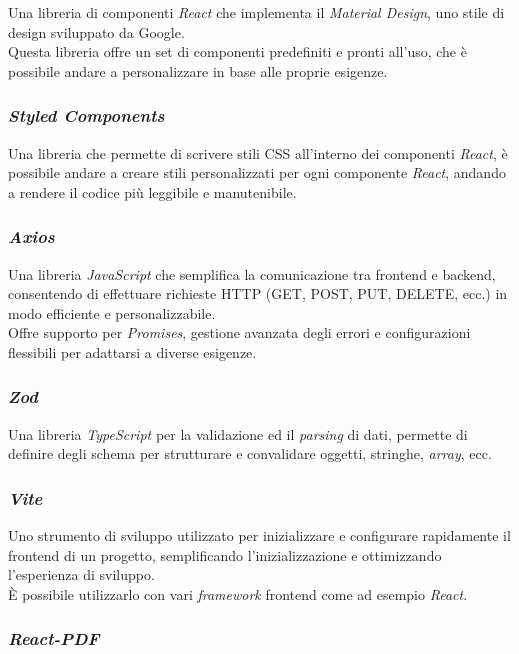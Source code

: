 Una libreria di componenti \textit{React} che implementa il \textit{Material Design}, uno stile di design sviluppato da Google.\\
Questa libreria offre un set di componenti predefiniti e pronti all’uso, che è possibile andare a personalizzare in base alle proprie esigenze.

\subsubsection{\textit{Styled Components}}

Una libreria che permette di scrivere stili CSS all’interno dei componenti \textit{React}, è possibile andare a creare stili personalizzati per ogni componente \textit{React}, andando a rendere il codice più leggibile e manutenibile.

\subsubsection{\textit{Axios}}

Una libreria \textit{JavaScript} che semplifica la comunicazione tra frontend e backend, consentendo di effettuare richieste HTTP (GET, POST, PUT, DELETE, ecc.) in modo efficiente e personalizzabile. \\
Offre supporto per \textit{Promises}, gestione avanzata degli errori e configurazioni flessibili per adattarsi a diverse esigenze.

\subsubsection{\textit{Zod}}

Una libreria \textit{TypeScript} per la validazione ed il \textit{parsing} di dati, permette di definire degli schema per strutturare e convalidare oggetti, stringhe, \textit{array}, ecc.

\subsubsection{\textit{Vite}}

Uno strumento di sviluppo utilizzato per inizializzare e configurare rapidamente il \gls{frontend} di un progetto, semplificando l'inizializzazione e ottimizzando l'esperienza di sviluppo.\\
È possibile utilizzarlo con vari \textit{framework} \gls{frontend} come ad esempio \textit{React}.

\subsubsection{\textit{React-PDF}}

